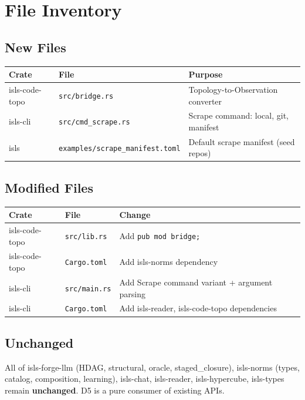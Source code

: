 \documentclass[11pt,a4paper]{article}
\begin{document}
\section{File Inventory}

\subsection{New Files}

\begin{longtable}{llp{7cm}}
\toprule
\textbf{Crate} & \textbf{File} & \textbf{Purpose} \\
\midrule
isls-code-topo & \texttt{src/bridge.rs}
  & Topology-to-Observation converter \\
isls-cli & \texttt{src/cmd\_scrape.rs}
  & Scrape command: local, git, manifest \\
isls & \texttt{examples/scrape\_manifest.toml}
  & Default scrape manifest (seed repos) \\
\bottomrule
\end{longtable}

\subsection{Modified Files}

\begin{longtable}{llp{7cm}}
\toprule
\textbf{Crate} & \textbf{File} & \textbf{Change} \\
\midrule
isls-code-topo & \texttt{src/lib.rs}
  & Add \texttt{pub mod bridge;} \\
isls-code-topo & \texttt{Cargo.toml}
  & Add isls-norms dependency \\
isls-cli & \texttt{src/main.rs}
  & Add Scrape command variant + argument parsing \\
isls-cli & \texttt{Cargo.toml}
  & Add isls-reader, isls-code-topo dependencies \\
\bottomrule
\end{longtable}

\subsection{Unchanged}

All of isls-forge-llm (HDAG, structural, oracle, staged\_closure),
isls-norms (types, catalog, composition, learning),
isls-chat, isls-reader, isls-hypercube, isls-types
remain \textbf{unchanged}. D5 is a pure consumer of existing APIs.
\end{document}
